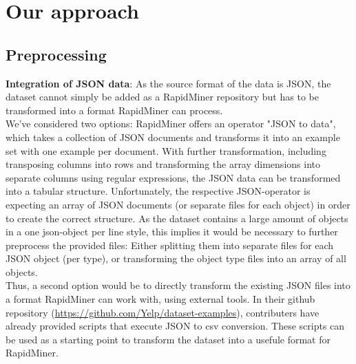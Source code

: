 \section{Our approach} %
\label{cha:approach}

\subsection{Preprocessing}
\label{sec:preprocessing}
\textbf{Integration of JSON data}: As the source format of the data is JSON, %
the dataset cannot simply be added as a RapidMiner repository but has to be transformed into a format RapidMiner can process.\\
We've considered two options: RapidMiner offers an operator "JSON to data", which takes a collection of JSON documents and transforms it into an example set with one example per document. With further transformation, including transposing columns into rows and transforming the array dimensions into separate columns using regular expressions, the JSON data can be transformed into a tabular structure. Unfortunately, the respective JSON-operator is expecting an array of JSON documents (or separate files for each object) in order to create the correct structure. As the dataset contains a large amount of objects in a one json-object per line style, this implies it would be necessary to further preprocess the provided files: Either splitting them into separate files for each JSON object (per type), or transforming the object type files into an array of all objects.\\
Thus, a second option would be to directly transform the existing JSON files into a format RapidMiner can work with, using external tools. In their github repository (\url{https://github.com/Yelp/dataset-examples}), contributers have already provided scripts that execute JSON to csv conversion. These scripts can be used as a starting point to transform the dataset into a usefule format for RapidMiner. %

